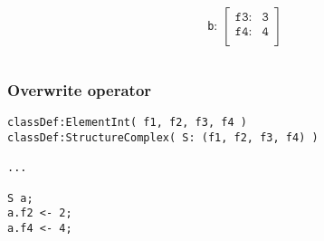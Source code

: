 \documentclass[11pt]{beamer}
\begin{document}
\begin{frame}[fragile]
\begin{columns}
\begin{column}{0.5\textwidth}
	\end{column}
	\begin{column}{0.5\textwidth}
		\begin{center}
			\texttt{b}: $\begin{bmatrix}
																				\texttt{f3:}      & \texttt{3}\\ 
																				\texttt{f4:}     	& \texttt{4}\\ 
																			\end{bmatrix}$
		\end{center}
	\end{column}
\end{columns}
\end{frame}

\begin{frame}[fragile]
\frametitle{Overwrite operator}
\scriptsize
\begin{lstlisting}[language=lekta]
classDef:ElementInt( f1, f2, f3, f4 )
classDef:StructureComplex( S: (f1, f2, f3, f4) )

...

S a;
a.f2 <- 2;
a.f4 <- 4;


\end{lstlisting}
\end{frame}
\end{document}
